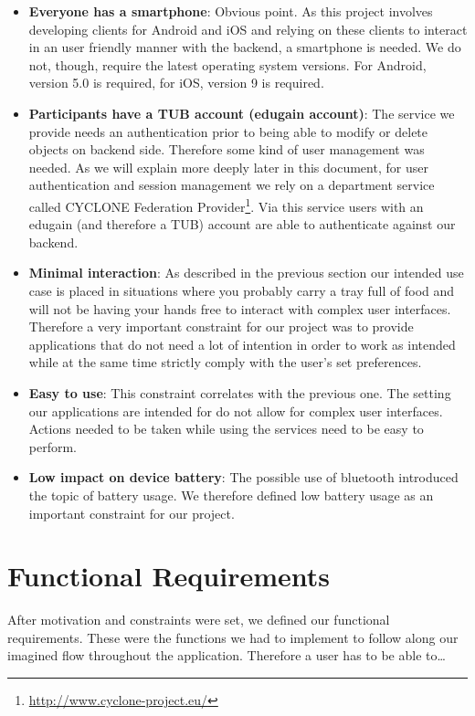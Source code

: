 \begin{itemize}
    \item \textbf{Everyone has a smartphone}: Obvious point. As this project involves developing clients for Android and iOS and relying on these clients to interact in an user friendly manner with the backend, a smartphone is needed. We do not, though, require the latest operating system versions. For Android, version 5.0 is required, for iOS, version 9 is required.
    \item \textbf{Participants have a TUB account (edugain account)}: The service we provide needs an authentication prior to being able to modify or delete objects on backend side. Therefore some kind of user management was needed. As we will explain more deeply later in this document, for user authentication and session management we rely on a department service called CYCLONE Federation Provider\footnote{\url{http://www.cyclone-project.eu/}}. Via this service users with an edugain (and therefore a TUB) account are able to authenticate against our backend.
    \item \textbf{Minimal interaction}: As described in the previous section our intended use case is placed in situations where you probably carry a tray full of food and will not be having your hands free to interact with complex user interfaces. Therefore a very important constraint for our project was to provide applications that do not need a lot of intention in order to work as intended while at the same time strictly comply with the user's set preferences.
    \item \textbf{Easy to use}: This constraint correlates with the previous one. The setting our applications are intended for do not allow for complex user interfaces. Actions needed to be taken while using the services need to be easy to perform.
    \item \textbf{Low impact on device battery}: The possible use of bluetooth introduced the topic of battery usage. We therefore defined low battery usage as an important constraint for our project.
\end{itemize}


\vspace{0.5cm}

\section{Functional Requirements}

After motivation and constraints were set, we defined our functional requirements. These were the functions we had to implement to follow along our imagined flow throughout the application. Therefore a user has to be able to\ldots

